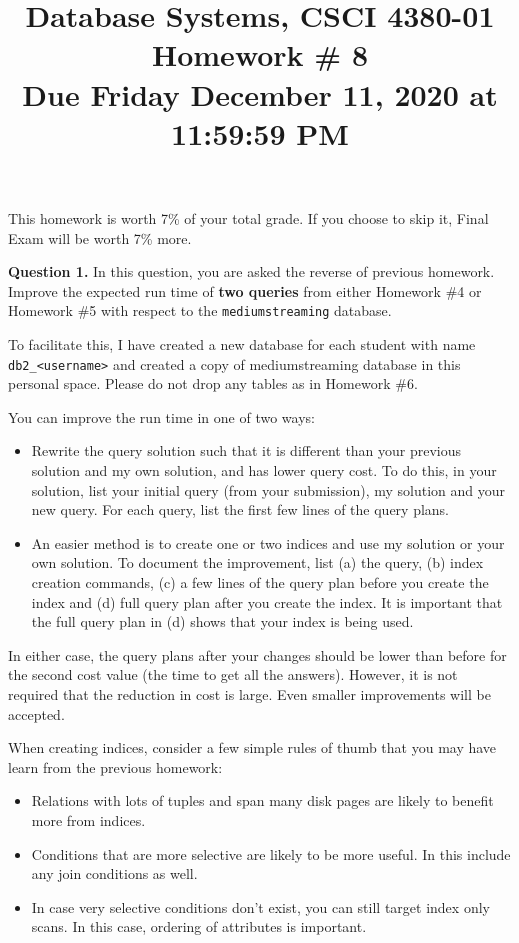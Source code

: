\documentclass[11pt]{article}
\title{Database Systems, CSCI 4380-01 \\
Homework \# 8 \\
Due Friday December 11, 2020 at 11:59:59 PM}
\date{}
\begin{document}
\maketitle

\vspace*{-0.7in}

 This homework is worth 7\% of your
total grade. If you choose to skip it, Final Exam will be worth 7\%
more.


{\bf Question 1.} In this question, you are asked the reverse of
previous homework. Improve the expected run time of {\bf two queries}
from either Homework \#4 or Homework \#5 with respect to the
\verb+mediumstreaming+ database.

To facilitate this, I have created a new database for each student
with name \verb+db2_<username>+ and created a copy of mediumstreaming
database in this personal space. Please do not drop any tables as
in Homework \#6.

You can improve the run time in one of two ways:

\begin{itemize}
\item Rewrite the query solution such that it is different than your
  previous solution and my own solution, and has lower query cost. To
  do this, in your solution, list your initial query (from your
  submission), my solution and your new query. For each query, list
  the first few lines of the query plans.

\item An easier method is to create one or two indices and use my
  solution or your own solution. To document the improvement, list (a)
  the query, (b) index creation commands, (c) a few lines of the query
  plan before you create the index and (d) full query plan after you
  create the index. It is important that the full query plan in (d)
  shows that your index is being used.
  \end{itemize}

In either case, the query plans after your changes should be lower
than before for the second cost value (the time to get all the
answers). However, it is not required that the reduction in cost is
large. Even smaller improvements will be accepted.

When creating indices, consider a few simple rules of thumb that you
may have learn from the previous homework:

\begin{itemize}
  \item Relations with lots of tuples and span many disk pages are
    likely to benefit more from indices.
  \item Conditions that are more selective are likely to be more
    useful. In this include any join conditions as well.
    \item In case very selective conditions don't exist, you can still
      target index only scans. In this case, ordering of attributes is
      important.
  \end{itemize}
\end{document}
